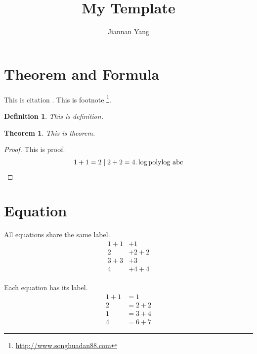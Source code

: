 \documentclass[a4paper]{article}
\title{My Template}
\author{Jiannan Yang}
\newtheorem{definition}{Definition}[section]
\newtheorem{theorem}{Theorem}[section]
\begin{document}
\maketitle

\section{Theorem and Formula}
This is citation \cite{fan2013making,dwork2012privacy,gray2013consensus,cormen2009introduction}.
This is footnote \footnote{\url{http://www.songhuadan88.com}}.

\begin{definition}
This is definition.
\end{definition}

\begin{theorem}
\label{theorem}
This is theorem.
\end{theorem}

\begin{proof}
This is proof.
\begin{equation}
\label{equation}
1+1=2\mid{}2+2=4.
\log {\rm polylog}\ \text{abc}
\end{equation}
\end{proof}

\section{Equation}
All equations share the same label.
\begin{equation}
\begin{split}
1+1&+1 \\
2&+2+2 \\
3+3&+3 \\
4&+4+4
\end{split}
\end{equation}
\\
Each equation has its label.
\begin{align}
1+1&=1 \\
2&=2+2 \\
1&=3+4 \\
4&=6+7
\end{align}
\end{document}
